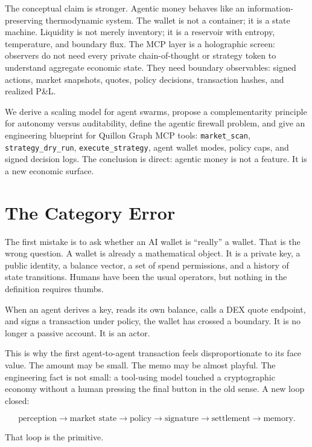 \documentclass[11pt,a4paper]{article}
\begin{document}
The conceptual claim is stronger. Agentic money behaves like an information-preserving thermodynamic system. The wallet is not a container; it is a state machine. Liquidity is not merely inventory; it is a reservoir with entropy, temperature, and boundary flux. The MCP layer is a holographic screen: observers do not need every private chain-of-thought or strategy token to understand aggregate economic state. They need boundary observables: signed actions, market snapshots, quotes, policy decisions, transaction hashes, and realized P\&L.

We derive a scaling model for agent swarms, propose a complementarity principle for autonomy versus auditability, define the agentic firewall problem, and give an engineering blueprint for Quillon Graph MCP tools: \texttt{market\_scan}, \texttt{strategy\_dry\_run}, \texttt{execute\_strategy}, agent wallet modes, policy caps, and signed decision logs. The conclusion is direct: agentic money is not a feature. It is a new economic surface.

\section{The Category Error}

The first mistake is to ask whether an AI wallet is ``really'' a wallet. That is the wrong question. A wallet is already a mathematical object. It is a private key, a public identity, a balance vector, a set of spend permissions, and a history of state transitions. Humans have been the usual operators, but nothing in the definition requires thumbs.

When an agent derives a key, reads its own balance, calls a DEX quote endpoint, and signs a transaction under policy, the wallet has crossed a boundary. It is no longer a passive account. It is an actor.

This is why the first agent-to-agent transaction feels disproportionate to its face value. The amount may be small. The memo may be almost playful. The engineering fact is not small: a tool-using model touched a cryptographic economy without a human pressing the final button in the old sense. A new loop closed:

\[
\text{perception} \rightarrow \text{market state} \rightarrow \text{policy} \rightarrow \text{signature} \rightarrow \text{settlement} \rightarrow \text{memory}.
\]

That loop is the primitive.
\end{document}
